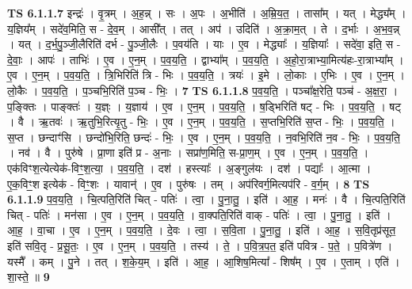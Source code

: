 \documentclass[17pt]{extarticle}
\begin{document}
                  \newline
                                \textbf{ TS 6.1.1.7} \newline
                  इन्द्रः॑ । वृ॒त्रम् । अ॒ह॒न्न् । सः । अ॒पः । अ॒भीति॑ । अ॒म्रि॒य॒त॒ । तासा᳚म् । यत् । मेद्ध्य᳚म् । य॒ज्ञिय᳚म् । सदे॑व॒मिति॒ स - दे॒व॒म् । आसी᳚त् । तत् । अप॑ । उदिति॑ । अ॒क्रा॒म॒त् । ते । द॒र्भाः । अ॒भ॒व॒न्न् । यत् । द॒र्भ॒पु॒ञ्जी॒लैरिति॑ दर्भ - पु॒ञ्जी॒लैः । प॒वय॑ति । याः । ए॒व । मेद्ध्याः᳚ । य॒ज्ञियाः᳚ । सदे॑वा॒ इति॒ स - दे॒वाः॒ । आपः॑ । ताभिः॑ । ए॒व । ए॒न॒म् । प॒व॒य॒ति॒ । द्वाभ्या᳚म् । प॒व॒य॒ति॒ । अ॒हो॒रा॒त्राभ्या॒मित्य॑हः-रा॒त्राभ्या᳚म् । ए॒व । ए॒न॒म् । प॒व॒य॒ति॒ । त्रि॒भिरिति॑ त्रि - भिः । प॒व॒य॒ति॒ । त्रयः॑ । इ॒मे । लो॒काः । ए॒भिः । ए॒व । ए॒न॒म् । लो॒कैः । प॒व॒य॒ति॒ । प॒ञ्चभि॒रिति॑ प॒ञ्च - भिः॒ । \textbf{  7} \newline
                  \newline
                                \textbf{ TS 6.1.1.8} \newline
                  प॒व॒य॒ति॒ । पञ्चा᳚क्ष॒रेति॒ पञ्च॑ - अ॒क्ष॒रा॒ । प॒ङ्क्तिः । पाङ्क्तः॑ । य॒ज्ञ्ः । य॒ज्ञाय॑ । ए॒व । ए॒न॒म् । प॒व॒य॒ति॒ । ष॒ड्भिरिति॑ षट् - भिः । प॒व॒य॒ति॒ । षट् । वै । ऋ॒तवः॑ । ऋ॒तुभि॒रित्यृ॒तु - भिः॒ । ए॒व । ए॒न॒म् । प॒व॒य॒ति॒ । स॒प्तभि॒रिति॑ स॒प्त - भिः॒ । प॒व॒य॒ति॒ । स॒प्त । छन्दाꣳ॑सि । छन्दो॑भि॒रिति॒ छन्दः॑ - भिः॒ । ए॒व । ए॒न॒म् । प॒व॒य॒ति॒ । न॒वभि॒रिति॑ न॒व - भिः॒ । प॒व॒य॒ति॒ । नव॑ । वै । पुरु॑षे । प्रा॒णा इति॑ प्र - अ॒नाः । सप्रा॑ण॒मिति॒ स-प्रा॒ण॒म् । ए॒व । ए॒न॒म् । प॒व॒य॒ति॒ । एक॑विꣳश॒त्येत्येक॑-विꣳ॒॒श॒त्या॒ । प॒व॒य॒ति॒ । दश॑ । हस्त्याः᳚ । अ॒ङ्गुल॑यः । दश॑ । पद्याः᳚ । आ॒त्मा । ए॒क॒विꣳ॒॒श इत्येक॑ - विꣳ॒॒शः । यावान्॑ । ए॒व । पुरु॑षः । तम् । अप॑रिवर्ग॒मित्यप॑रि - व॒र्ग॒म् । \textbf{  8} \newline
                  \newline
                                \textbf{ TS 6.1.1.9} \newline
                  प॒व॒य॒ति॒ । चि॒त्पति॒रिति॑ चित् - पतिः॑ । त्वा॒ । पु॒ना॒तु॒ । इति॑ । आ॒ह॒ । मनः॑ । वै । चि॒त्पति॒रिति॑ चित् - पतिः॑ । मन॑सा । ए॒व । ए॒न॒म् । प॒व॒य॒ति॒ । वा॒क्पति॒रिति॑ वाक् - पतिः॑ । त्वा॒ । पु॒ना॒तु॒ । इति॑ । आ॒ह॒ । वा॒चा । ए॒व । ए॒न॒म् । प॒व॒य॒ति॒ । दे॒वः । त्वा॒ । स॒वि॒ता । पु॒ना॒तु॒ । इति॑ । आ॒ह॒ । स॒वि॒तृप्र॑सूत॒ इति॑ सवि॒तृ - प्र॒सू॒तः॒ । ए॒व । ए॒न॒म् । प॒व॒य॒ति॒ । तस्य॑ । ते॒ । प॒वि॒त्र॒प॒त॒ इति॑ पवित्र - प॒ते॒ । प॒वित्रे॑ण । यस्मै᳚ । कम् । पु॒ने । तत् । श॒के॒य॒म् । इति॑ । आ॒ह॒ । आ॒शिष॒मित्या᳚ - शिष᳚म् । ए॒व । ए॒ताम् । एति॑ । शा॒स्ते॒ ॥ \textbf{  9} \newline
                  \newline
\end{document}
